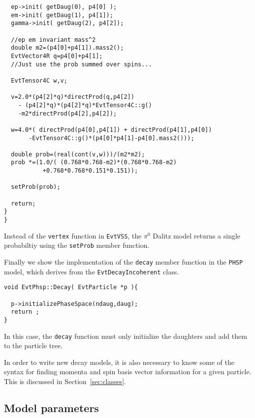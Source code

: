 \begin{footnotesize}
\begin{verbatim}
  ep->init( getDaug(0), p4[0] );
  em->init( getDaug(1), p4[1]);
  gamma->init( getDaug(2), p4[2]);

  //ep em invariant mass^2
  double m2=(p4[0]+p4[1]).mass2();
  EvtVector4R q=p4[0]+p4[1];
  //Just use the prob summed over spins...

  EvtTensor4C w,v;

  v=2.0*(p4[2]*q)*directProd(q,p4[2]) 
    - (p4[2]*q)*(p4[2]*q)*EvtTensor4C::g()
    -m2*directProd(p4[2],p4[2]);
 
  w=4.0*( directProd(p4[0],p4[1]) + directProd(p4[1],p4[0])
	   -EvtTensor4C::g()*(p4[0]*p4[1]-p4[0].mass2()));

  double prob=(real(cont(v,w)))/(m2*m2);
  prob *=(1.0/( (0.768*0.768-m2)*(0.768*0.768-m2)
           +0.768*0.768*0.151*0.151));

  setProb(prob);

  return;
}
}
\end{verbatim}
\end{footnotesize}

Instead of the {\tt vertex} function in {\tt EvtVSS},
the $\pi^0$ Dalitz model returns a single probabiltiy
using the {\tt setProb} member function.  

Finally we show the implementation of the {\tt decay}
member function in the {\tt PHSP} model, which derives
from the {\tt EvtDecayIncoherent} class.
\begin{footnotesize}
\begin{verbatim}
void EvtPhsp::Decay( EvtParticle *p ){

  p->initializePhaseSpace(ndaug,daug);
  return ;
}

\end{verbatim}
\end{footnotesize}

In this case, the {\tt decay} function must only
initialize the daughters and add them to the
particle tree.

In order to write new decay models, it is also 
necessary to know some of the syntax for 
finding momenta and spin basis vector information
for a given particle.  This is discussed in Section~\ref{sec:classes}.

\subsection{Model parameters}
\label{sect:modelparameters}

